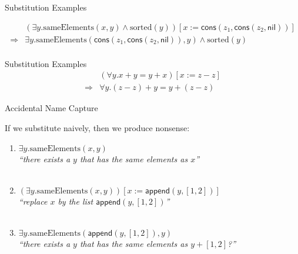 \documentclass[xetex,aspectratio=169,14pt,hyperref={pdfpagelabels=true,pdflang={en-GB}}]{beamer}
\begin{document}
\begin{frame}
  {Substitution Examples}

  \begin{displaymath}
    \begin{array}{cl}
      &(\exists y. \mathrm{sameElements}(x,y) \land \mathrm{sorted}(y))[x:=\mathsf{cons}(z_1,\mathsf{cons}(z_2,\mathsf{nil}))]\\
      \Longrightarrow&\exists y. \mathrm{sameElements}(\mathsf{cons}(z_1,\mathsf{cons}(z_2,\mathsf{nil})),y) \land \mathrm{sorted}(y)\\
    \end{array}
  \end{displaymath}
\end{frame}

\begin{frame}
  {Substitution Examples}
  \begin{displaymath}
    \begin{array}{cl}
      &(\forall y. x+y=y+x)[x:=z-z] \\
      \Longrightarrow&\forall y. (z-z)+y = y+(z-z)
    \end{array}
  \end{displaymath}
\end{frame}

\begin{frame}[t]
  {Accidental Name Capture}

  If we substitute naively, then we produce nonsense:
  \begin{enumerate}
  \item $\exists y. \mathrm{sameElements}(x,y)$ \\
    \emph{``there exists a $y$ that has the same elements as $x$''}\\
    ~\\
  \item $(\exists y. \mathrm{sameElements}(x,y))[x:=\mathsf{append}(y,[1,2])]$\\
    \emph{``replace $x$ by the list $\mathsf{append}(y,[1,2])$''}\\
    ~\\
  \item $\exists y. \mathrm{sameElements}(\mathsf{append}(y,[1,2]),y)$\\
    \emph{``there exists a $y$ that has the same elements as $y + [1,2]$?''}
  \end{enumerate}
\end{frame}
\end{document}
